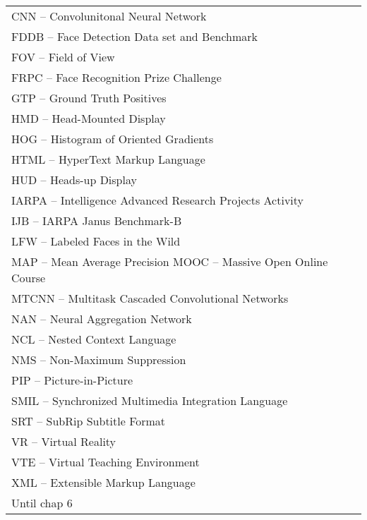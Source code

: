 
\begin{thenotations}
\renewcommand{\arraystretch}{1.5}
  \noindent
  \begin{tabular}{ll}

CNN -- Convolunitonal Neural Network\\
FDDB -- Face Detection Data set and Benchmark\\
FOV -- Field of View\\
FRPC -- Face Recognition Prize Challenge\\
GTP -- Ground Truth Positives\\
HMD -- Head-Mounted Display\\
HOG -- Histogram of Oriented Gradients\\
HTML -- HyperText Markup Language\\
HUD -- Heads-up Display\\
IARPA -- Intelligence Advanced Research Projects Activity\\
IJB -- IARPA Janus Benchmark-B\\
LFW -- Labeled Faces in the Wild\\
MAP -- Mean Average Precision
MOOC -- Massive Open Online Course\\
MTCNN -- Multitask Cascaded Convolutional Networks\\
NAN -- Neural Aggregation Network\\
NCL -- Nested Context Language\\
NMS -- Non-Maximum Suppression\\
PIP -- Picture-in-Picture\\
SMIL -- Synchronized Multimedia Integration Language\\
SRT -- SubRip Subtitle Format\\
VR -- Virtual Reality\\
VTE -- Virtual Teaching Environment\\
XML -- Extensible Markup Language\\

Until chap 6

  \end{tabular}

\end{thenotations}